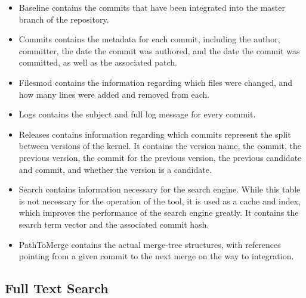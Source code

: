 \begin{itemize}
  \item

    Baseline contains the commits that have been integrated into the
    master branch of the repository.

  \item

    Commits contains the metadata for each commit, including the author,
    committer, the date the commit was authored, and the date the commit
    was committed, as well as the associated patch.

  \item

    Filesmod contains the information regarding which files were changed,
    and how many lines were added and removed from each.

  \item

    Logs contains the subject and full log message for every commit.

  \item

    Releases contains information regarding which commits represent the
    split between versions of the kernel. It contains the version name,
    the commit, the previous version, the commit for the previous
    version, the previous candidate and commit, and whether the version
    is a candidate.

  \item

    Search contains information necessary for the search engine. While
    this table is not necessary for the operation of the tool, it is
    used as a cache and index, which improves the performance of the
    search engine greatly. It contains the search term vector and the
    associated commit hash.

  \item

    PathToMerge contains the actual merge-tree structures, with
    references pointing from a given commit to the next merge on the way
    to integration.

\end{itemize}


\subsection{Full Text Search}\label{sub:full_text_search}


